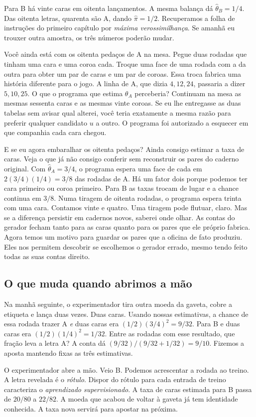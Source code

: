 \documentclass[12pt,oneside]{article}
\newcommand{\secao}[1]{\Needspace{5.2\baselineskip}\subsection*{#1}}
\newcommand{\bookanchor}[1]{\phantomsection\label{#1}}
\begin{document}
Para\bookanchor{topic-03-4} B há vinte caras em oitenta lançamentos. A mesma balança dá $\widehat\theta_B=1/4$. Das oitenta letras, quarenta são A, dando $\widehat\pi=1/2$. Recuperamos a folha de instruções do primeiro capítulo por \emph{máxima verossimilhança}. Se amanhã eu trouxer outra amostra, os três números poderão mudar.

Você ainda está com os oitenta pedaços de A na mesa. Pegue duas rodadas que tinham uma cara e uma coroa cada. Troque uma face de uma rodada com a da outra para obter um par de caras e um par de coroas. Essa troca fabrica uma história diferente para o jogo. A linha de A, que dizia $4,12,24$, passaria a dizer $5,10,25$. O que o programa que estima $\theta_A$ perceberia? Continuam na mesa as mesmas sessenta caras e as mesmas vinte coroas. Se eu lhe entregasse as duas tabelas sem avisar qual alterei, você teria exatamente a mesma razão para preferir qualquer candidato $u$ a outro. O programa foi autorizado a esquecer em que companhia cada cara chegou.

E se eu agora embaralhar os oitenta pedaços? Ainda consigo estimar a taxa de caras. Veja o que já não consigo conferir sem reconstruir os pares do caderno original. Com $\widehat\theta_A=3/4$, o programa espera uma face de cada em $2(3/4)(1/4)=3/8$ das rodadas de A. Há um fator dois porque podemos ter cara primeiro ou coroa primeiro. Para B as taxas trocam de lugar e a chance continua em $3/8$. Numa tiragem de oitenta rodadas, o programa espera trinta com uma cara. Contamos vinte e quatro. Uma tiragem pode flutuar, claro. Mas se a diferença persistir em cadernos novos, saberei onde olhar. As contas do gerador fecham tanto para as caras quanto para os pares que ele próprio fabrica. Agora temos um motivo para guardar os pares que a oficina de fato produziu. Eles nos permitem descobrir se escolhemos o gerador errado, mesmo tendo feito todas as suas contas direito.

\secao{O que muda quando abrimos a mão}
Na manhã seguinte, o experimentador tira outra moeda da gaveta, cobre a etiqueta e lança duas vezes. Duas caras. Usando nossas estimativas, a chance de essa rodada trazer A \emph{e} duas caras era $(1/2)(3/4)^2=9/32$. Para B e duas caras era $(1/2)(1/4)^2=1/32$. Entre as rodadas com esse resultado, que fração leva a letra A? A conta dá $(9/32)/(9/32+1/32)=9/10$. Fizemos a aposta mantendo fixas as três estimativas.

O experimentador abre a mão. Veio B. Podemos acrescentar a rodada ao treino. A letra revelada é o \emph{rótulo}. Dispor do rótulo para cada entrada de treino caracteriza o \emph{aprendizado supervisionado}. A taxa de caras estimada para B passa de $20/80$ a $22/82$. A moeda que acabou de voltar à gaveta já tem identidade conhecida. A taxa nova servirá para apostar na próxima.
\end{document}
